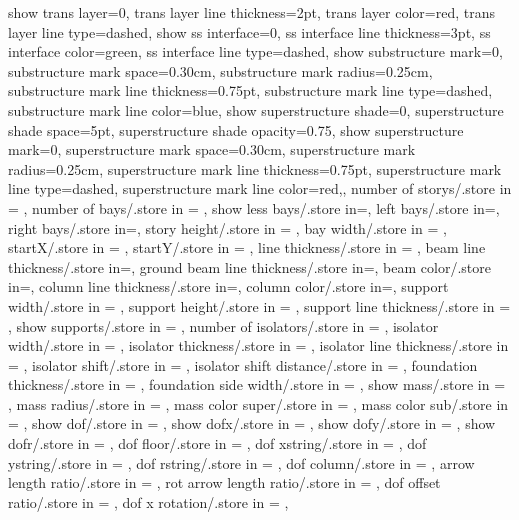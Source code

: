 {{  show trans layer=0,
  trans layer line thickness=2pt,
  trans layer color=red,
  trans layer line type=dashed,
  show ss interface=0,
  ss interface line thickness=3pt,
  ss interface color=green,
  ss interface line type=dashed,
  show substructure mark=0,
  substructure mark space=0.30cm,
  substructure mark radius=0.25cm,
  substructure mark line thickness=0.75pt,
  substructure mark line type=dashed,
  substructure mark line color=blue,
  show superstructure shade=0,
  superstructure shade space=5pt,
  superstructure shade opacity=0.75,
  show superstructure mark=0,
  superstructure mark space=0.30cm,
  superstructure mark radius=0.25cm,
  superstructure mark line thickness=0.75pt,
  superstructure mark line type=dashed,
  superstructure mark line color=red,},
  number of storys/.store in = \storynumber,
  number of bays/.store in = \baynumber,
  show less bays/.store in=\showlessbays,
  left bays/.store in=\leftbays,
  right bays/.store in=\rightbays,
  story height/.store in = \storyheight,
  bay width/.store in = \baywidth,
  startX/.store in = \startx,
  startY/.store in = \starty,
  line thickness/.store in = \linet,
  beam line thickness/.store in=\beamlinet,
  ground beam line thickness/.store in=\groundbeamlinet,
  beam color/.store in=\beamcolor,
  column line thickness/.store in=\collinet,
  column color/.store in=\columncolor,
  support width/.store in = \supportwidth,
  support height/.store in = \supportheight,
  support line thickness/.store in = \baselinet,
  show supports/.store in = \showsupports,
  number of isolators/.store in = \numberofisolators,
  isolator width/.store in = \isolationwidth,
  isolator thickness/.store in = \isolationdepth,
  isolator line thickness/.store in = \isolinet,
  isolator shift/.store in = \isoshiftyn,
  isolator shift distance/.store in = \isoshift,
  foundation thickness/.store in = \foundationdepth,
  foundation side width/.store in = \foundsidew,
  show mass/.store in = \showmass,
  mass radius/.store in = \massrad,
  mass color super/.store in = \masscolorsuper,
  mass color sub/.store in = \masscolorsub,
  show dof/.store in = \showdof,
  show dofx/.store in = \shodofx,
  show dofy/.store in = \shodofy,
  show dofr/.store in = \shodofr,
  dof floor/.store in = \doflocfloor,
  dof xstring/.store in = \dofxstr,
  dof ystring/.store in = \dofystr,
  dof rstring/.store in = \dofrstr,
  dof column/.store in = \dofloccolumn,
  arrow length ratio/.store in = \arrowlenratio,
  rot arrow length ratio/.store in = \rotarrowlenratio,
  dof offset ratio/.store in = \dofoffsetratio,
  dof x rotation/.store in = \dofxrotation,
}
